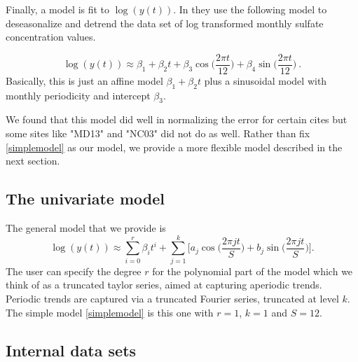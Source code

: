 \documentclass[11pt]{article}\usepackage[]{graphicx}\usepackage[]{color}
\begin{document}
Finally, a model is fit to $\log(y(t))$.
      In \cite{Zidek3} they use the following model to deseasonalize and detrend the data set of log transformed monthly sulfate concentration values.

\begin{equation} \label{simplemodel}
         \log(y(t))\approx \beta_{1} + \beta_{2}t + \beta_{3}\cos\bigg(\frac{2\pi t}{12}\bigg) + \beta_{4}\sin\bigg(\frac{2\pi t}{12}\bigg)~.
\end{equation}
Basically, this is just an affine model $ \beta_{1} + \beta_{2}t$ plus
    a sinusoidal model with monthly periodicity and intercept $\beta_3$.


  We found that this model did well in normalizing the error for
  certain cites but some sites like "MD13" and "NC03" did not do as well. Rather than
  fix \eqref{simplemodel} as our model, we provide a more flexible model described in the next section.%

  \subsection{The univariate model}

The general model that we provide is
\[
\log(y(t))\approx \sum_{i=0}^r \beta_{i}t^i + \sum_{j=1}^{k} \bigg[a_j \cos \bigg(\frac{2\pi jt}{S}\bigg) +  b_j \sin \bigg(\frac{2\pi jt}{S}\bigg)\bigg].
\]
The user can specify the degree $r$ for the polynomial part of the model which we think of as a truncated taylor series, aimed at capturing aperiodic trends.
Periodic trends are captured via a truncated Fourier series, truncated at level $k$.
The simple model \eqref{simplemodel} is this one with $r=1$, $k=1$ and $S=12$.


\subsection{Internal data sets}
\end{document}
